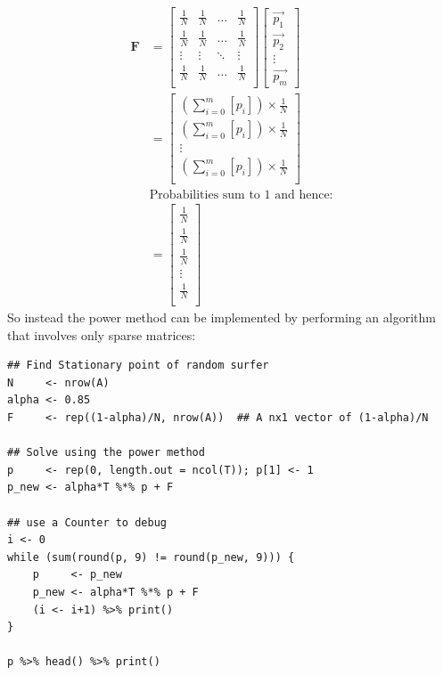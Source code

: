 \documentclass[11pt]{article}
\begin{document}
\begin{align}
\mathbf{F} &=
\begin{bmatrix}
\frac{1}{N} & \frac{1}{N} & \ldots & \frac{1}{N} \\
\frac{1}{N} & \frac{1}{N} & \ldots & \frac{1}{N} \\
\vdots      & \vdots      & \ddots & \vdots \\
\frac{1}{N} & \frac{1}{N} & \ldots & \frac{1}{N} \\
\end{bmatrix} \label{eq:bgVal2}
\begin{bmatrix}
\vec{p_1} \\ \vec{p_2} \\ \vdots \\ \vec{p_m}
\end{bmatrix}  \\
&= \begin{bmatrix}
\left( \sum^{m}_{i= 0}   \left[ p_i \right]  \right) \times \frac{1}{N} \\
\left( \sum^{m}_{i= 0}   \left[ p_i \right]  \right) \times \frac{1}{N} \\
\vdots  \\
\left( \sum^{m}_{i= 0}   \left[ p_i \right]  \right) \times \frac{1}{N} \\
\end{bmatrix}  \\
& \text{Probabilities sum to 1 and hence:} \\
&= \begin{bmatrix}
\frac{1}{N} \\
\frac{1}{N} \\
\frac{1}{N} \\
\vdots  \\
\frac{1}{N} \\
\end{bmatrix}
\end{align}
So instead the power method can be implemented by performing an algorithm that involves only sparse matrices:

\begin{verbatim}
## Find Stationary point of random surfer
N     <- nrow(A)
alpha <- 0.85
F     <- rep((1-alpha)/N, nrow(A))  ## A nx1 vector of (1-alpha)/N

## Solve using the power method
p     <- rep(0, length.out = ncol(T)); p[1] <- 1
p_new <- alpha*T %*% p + F

## use a Counter to debug
i <- 0
while (sum(round(p, 9) != round(p_new, 9))) {
    p     <- p_new
    p_new <- alpha*T %*% p + F
    (i <- i+1) %>% print()
}

p %>% head() %>% print()
\end{verbatim}
\end{document}
